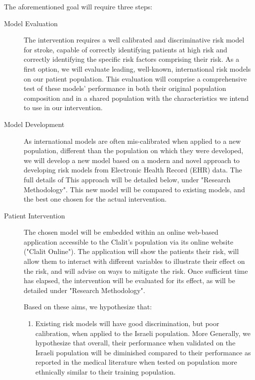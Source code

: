 \documentclass[a4paper,12pt]{article}
\begin{document}
	The aforementioned goal will require three steps:
	\begin{description}
		
		\item[Model Evaluation] The intervention requires a well calibrated and discriminative risk model for stroke, capable of correctly identifying patients at high risk and correctly identifying the specific risk factors comprising their risk. As a first option, we will evaluate leading, well-known, international risk models on our patient population. This evaluation will comprise a comprehensive test of these models' performance in both their original population composition and in a shared population with the characteristics we intend to use in our intervention.
		
		\item[Model Development] As international models are often mis-calibrated when applied to a new population, different than the population on which they were developed, we will develop a new model based on a modern and novel approach to developing risk models from Electronic Health Record (EHR) data. The full details of This approach will be detailed below, under "Research Methodology". This new model will be compared to existing models, and the best one chosen for the actual intervention.
		
		\item[Patient Intervention] The chosen model will be embedded within an online web-based application accessible to the Clalit's population via its online website ("Clalit Online"). The application will show the patients their risk, will allow them to interact with different variables to illustrate their effect on the risk, and will advise on ways to mitigate the risk. Once sufficient time has elapsed, the intervention will be evaluated for its effect, as will be detailed under "Research Methodology".
		
		Based on these aims, we hypothesize that:
		\begin{enumerate}
			
			\item Existing risk models will have good discrimination, but poor calibration, when applied to the Israeli population. More Generally, we hypothesize that overall, their performance when validated on the Israeli population will be diminished compared to their performance as reported in the medical literature when tested on population more ethnically similar to their training population.
			

\end{enumerate}
\end{description}
\end{document}
